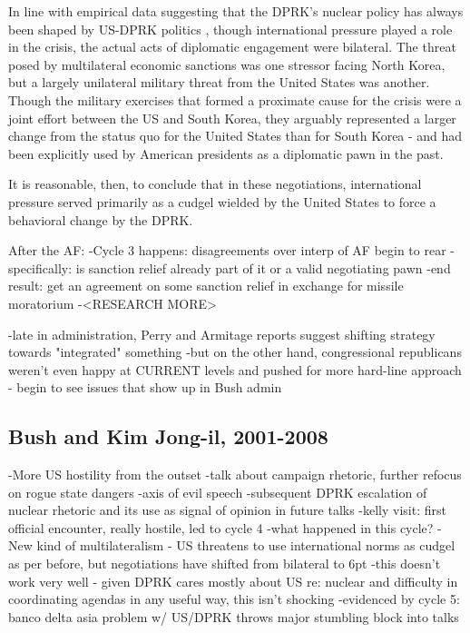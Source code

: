 \documentclass{article}
\begin{document}
In line with empirical data suggesting that the DPRK's nuclear policy has always been shaped by US-DPRK politics \cite{rich14}, though international pressure played a role in the crisis, the actual acts of diplomatic engagement were bilateral. The threat posed by multilateral economic sanctions was one stressor facing North Korea, but a largely unilateral military threat from the United States was another. Though the military exercises that formed a proximate cause for the crisis were a joint effort between the US and South Korea, they arguably represented a larger change from the status quo for the United States than for South Korea - and had been explicitly used by American presidents as a diplomatic pawn in the past.

It is reasonable, then, to conclude that in these negotiations, international pressure served primarily as a cudgel wielded by the United States to force a behavioral change by the DPRK. 



			
After the AF:
	-Cycle 3 happens: disagreements over interp of AF begin to rear
		-specifically: is sanction relief already part of it or a valid negotiating pawn
		-end result: get an agreement on some sanction relief in exchange for missile moratorium
		-<RESEARCH MORE>
	
	-late in administration, Perry and Armitage reports suggest shifting strategy towards "integrated" something \cite{perry,armitage}
		-but on the other hand, congressional republicans weren't even happy at CURRENT levels and pushed for more hard-line approach - begin to see issues that show up in Bush admin \cite{harnisch}
	
\subsection{Bush and Kim Jong-il, 2001-2008}
	-More US hostility from the outset
		-talk about campaign rhetoric, further refocus on rogue state dangers
	-axis of evil speech
		-subsequent DPRK escalation of nuclear rhetoric and its use as signal of opinion in future talks
	-kelly visit: first official encounter, really hostile, led to cycle 4
		-what happened in this cycle?
	-New kind of multilateralism - US threatens to use international norms as cudgel as per before, but negotiations have shifted from bilateral to 6pt
		-this doesn't work very well - given DPRK cares mostly about US re: nuclear and difficulty in coordinating agendas in any useful way, this isn't shocking
		-evidenced by cycle 5: banco delta asia problem w/ US/DPRK throws major stumbling block into talks
		
\end{document}
